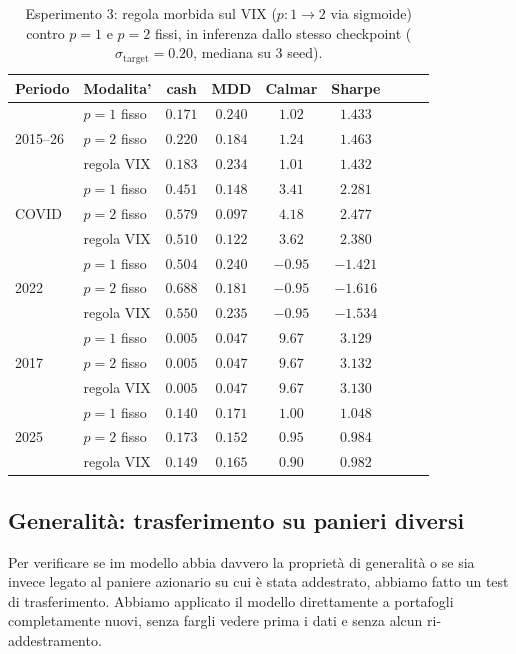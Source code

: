 \begin{table}[H]
\centering
\small
\caption{Esperimento 3: regola morbida sul VIX ($p:1\!\to\!2$ via
sigmoide) contro $p=1$ e $p=2$ fissi, in inferenza dallo stesso checkpoint
($\sigma_{\mathrm{target}}=0.20$, mediana su 3 seed).}
\label{tab:exp3-regola}
\begin{tabular}{llccccccc}
\toprule
Periodo & Modalita' & cash & MDD & Calmar & Sharpe \\
\midrule
\multirow{3}{*}{2015--26}
 & $p=1$ fisso  & $0.171$ & $0.240$ & $1.02$ & $1.433$ \\
 & $p=2$ fisso  & $0.220$ & $0.184$ & $1.24$  & $1.463$ \\
 & regola VIX   & $0.183$ & $0.234$ & $1.01$ & $1.432$ \\
\midrule
\multirow{3}{*}{COVID}
 & $p=1$ fisso  & $0.451$ & $0.148$ & $3.41$ & $2.281$ \\
 & $p=2$ fisso  & $0.579$ & $0.097$ & $4.18$ & $2.477$ \\
 & regola VIX   & $0.510$ & $0.122$ & $3.62$ & $2.380$ \\
\midrule
\multirow{3}{*}{2022}
 & $p=1$ fisso  & $0.504$ & $0.240$ & $-0.95$ & $-1.421$ \\
 & $p=2$ fisso  & $0.688$ & $0.181$ & $-0.95$ & $-1.616$ \\
 & regola VIX   & $0.550$ & $0.235$ & $-0.95$ & $-1.534$ \\
\midrule
\multirow{3}{*}{2017}
 & $p=1$ fisso  & $0.005$ & $0.047$ & $9.67$ & $3.129$ \\
 & $p=2$ fisso  & $0.005$ & $0.047$ & $9.67$ & $3.132$ \\
 & regola VIX   & $0.005$ & $0.047$ & $9.67$ & $3.130$ \\
\midrule
\multirow{3}{*}{2025}
 & $p=1$ fisso  & $0.140$ & $0.171$ & $1.00$ & $1.048$ \\
 & $p=2$ fisso  & $0.173$ & $0.152$ & $0.95$ & $0.984$ \\
 & regola VIX   & $0.149$ & $0.165$ & $0.90$ & $0.982$ \\
\bottomrule
\end{tabular}
\end{table}


\subsection{Generalità: trasferimento su panieri diversi}

Per verificare se im modello abbia davvero la proprietà di generalità o se sia invece legato al paniere azionario su cui è stata addestrato, abbiamo fatto un test di trasferimento. Abbiamo applicato il modello direttamente a portafogli completamente nuovi, senza fargli vedere prima i dati e senza alcun ri-addestramento. 

